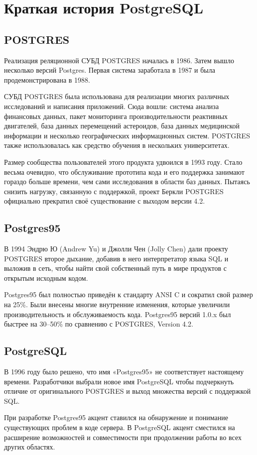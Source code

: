 \section{Краткая история PostgreSQL}\label{sec:postgresql-history}

\subsection{POSTGRES}\label{subsec:postgres}

Реализация реляционной СУБД POSTGRES началась в 1986. Затем вышло несколько версий Postgres. Первая система заработала в 1987 и была продемонстрирована в 1988.

СУБД POSTGRES была использована для реализации многих различных исследований и написания приложений. Сюда вошли: система анализа финансовых данных, пакет мониторинга производительности реактивных двигателей, база данных перемещений астероидов, база данных медицинской информации и несколько географических информационных систем. POSTGRES также использовалась как средство обучения в нескольких университетах.

Размер сообщества пользователей этого продукта удвоился в 1993 году. Стало весьма очевидно, что обслуживание прототипа кода и его поддержка занимают гораздо больше времени, чем сами исследования в области баз данных. Пытаясь снизить нагрузку, связанную с поддержкой, проект Беркли POSTGRES официально прекратил своё существование с выходом версии 4.2.

\subsection{Postgres95}\label{subsec:postgres95}

В 1994 Эндрю Ю (Andrew Yu) и Джолли Чен (Jolly Chen) дали проекту POSTGRES второе дыхание, добавив в него интерпретатор языка SQL и выложив в сеть, чтобы найти свой собственный путь в мире продуктов с открытым исходным кодом.

Postgres95 был полностью приведён к стандарту ANSI C и сократил свой размер на 25\%. Были внесены многие внутренние изменения, которые увеличили производительность и обслуживаемость кода. Postgres95 версий 1.0.x был быстрее на 30–50\% по сравнению с POSTGRES, Version 4.2.

\subsection{PostgreSQL}\label{subsec:postgresql}

В 1996 году было решено, что имя «Postgres95» не соответствует настоящему времени. Разработчики выбрали новое имя PostgreSQL чтобы подчеркнуть отличие от оригинального POSTGRES и выход множества версий с поддержкой SQL.

При разработке Postgres95 акцент ставился на обнаружение и понимание существующих проблем в коде сервера. В PostgreSQL акцент сместился на расширение возможностей и совместимости при продолжении работы во всех других областях.\cite{postgresql-12}
